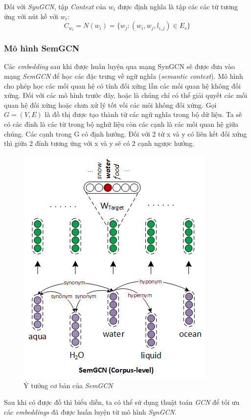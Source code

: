 Đối với \textit{SynGCN}, tập \textit{Context} của $w_i$ được định nghĩa là tập các các từ tương ứng với nút kề với $w_i$:
\begin{equation*}
	C_{w_i} = N(w_i) = \{w_j: (w_i, w_j, l_{i,j}) \in E_s\}
\end{equation*}


\subsubsection{Mô hình SemGCN}

Các \textit{embedding} sau khi được huấn luyện qua mạng SynGCN sẽ được đưa vào mạng \textit{SemGCN} để học các đặc trưng về ngữ nghĩa (\textit{semantic context}). Mô hình cho phép học các mối quan hệ có tính đối xứng lẫn các mối quan hệ không đối xứng. Đối với các mô hình trước đây, hoặc là chúng chỉ có thể giải quyết các mối quan hệ đối xứng hoặc chưa xử lý tốt vối các môi không đối xứng. Gọi $G =(V,E)$ là đồ thị được tạo thành từ các ngữ nghĩa trong bộ dữ liệu. Ta sẽ có các đỉnh là các từ trong bộ nghữ liệu còn các cạnh là các mối quan hệ giữa chúng. Các cạnh trong G có định hướng. Đối với 2 từ x và y có liên kết đối xứng thì giữa 2 đỉnh tương ứng với x và y sẽ có 2 cạnh ngược hướng.

\begin{figure}[H]
    \begin{center}
        \includegraphics[scale=1.0]{images/SemGCN_model}
        \caption{Ý tưởng cơ bản của \textit{SemGCN} \cite{wordgcn2019}}
        \label{fig:SemGCN}
    \end{center}
\end{figure}


Sau khi có được đồ thì biểu diễn, ta có thể sử dụng thuật toán \textit{GCN} để tối ưu các \textit{embeddings} đã được huấn luyện từ mô hình \textit{SynGCN}.
